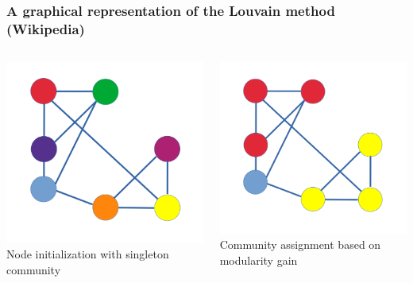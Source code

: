 \documentclass[aspectratio=1610]{beamer}
\begin{document}
\begin{frame}
    \frametitle{A graphical representation of the Louvain method (Wikipedia)}
    \begin{columns}
        \begin{column}{0.33\textwidth}
            \includegraphics[width=\textwidth]{Louvain_Step1.png}
			Node initialization with singleton community
        \end{column}

        \begin{column}{0.33\textwidth}
            \includegraphics[width=\textwidth]{Louvain_Step2.png}
			Community assignment based on modularity gain
        \end{column}


\end{columns}
\end{frame}
\end{document}
